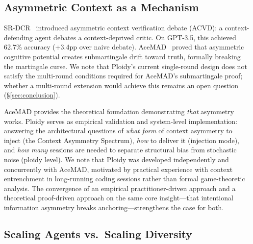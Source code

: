 \documentclass[11pt]{article}
\begin{document}
\subsection{Asymmetric Context as a Mechanism}
\label{sec:asymmetric}

SR-DCR~\citep{srdcr2025} introduced asymmetric context verification debate (ACVD): a context-defending agent debates a context-deprived critic. On GPT-3.5, this achieved 62.7\% accuracy (+3.4pp over naive debate). AceMAD~\citep{liu2026acemad} proved that asymmetric cognitive potential creates submartingale drift toward truth, formally breaking the martingale curse. We note that Ploidy's current single-round design does not satisfy the multi-round conditions required for AceMAD's submartingale proof; whether a multi-round extension would achieve this remains an open question (\S\ref{sec:conclusion}).

AceMAD provides the theoretical foundation demonstrating \emph{that} asymmetry works. Ploidy serves as empirical validation and system-level implementation: answering the architectural questions of \emph{what form} of context asymmetry to inject (the Context Asymmetry Spectrum), \emph{how} to deliver it (injection mode), and \emph{how many} sessions are needed to separate structural bias from stochastic noise (ploidy level). We note that Ploidy was developed independently and concurrently with AceMAD, motivated by practical experience with context entrenchment in long-running coding sessions rather than formal game-theoretic analysis. The convergence of an empirical practitioner-driven approach and a theoretical proof-driven approach on the same core insight---that intentional information asymmetry breaks anchoring---strengthens the case for both.

\subsection{Scaling Agents vs.\ Scaling Diversity}
\label{sec:scaling}
\end{document}

